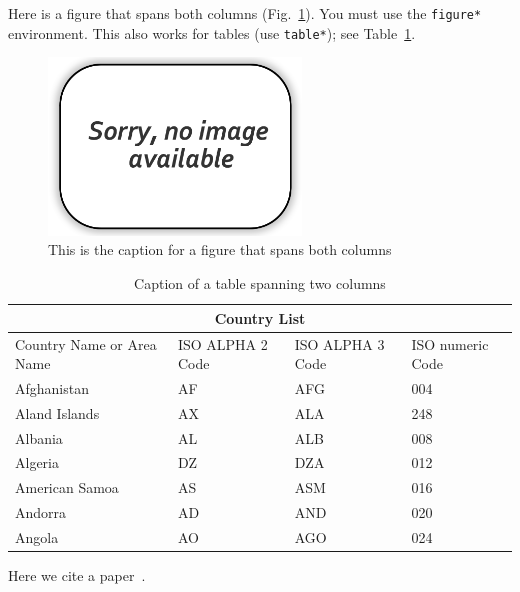 \documentclass[12pt,twocolumn]{article}
\begin{document}
Here is a figure that spans both columns (Fig.~\ref{fig:two_cols}).  You must use the {\tt figure*} environment.  This also works for tables (use {\tt table*}); see Table~\ref{t:two_cols}.
\begin{figure}
	\centering
	\includegraphics[width=0.6\textwidth]{Figs/no-image.png}
	\caption{{\small This is the caption for a figure that spans both columns}}    
	\label{fig:two_cols}
\end{figure}

\begin{table}
	\centering
\begin{tabular}{ |p{3cm}||p{3cm}|p{3cm}|p{3cm}|  }
	\hline
	\multicolumn{4}{|c|}{Country List} \\
	\hline
	Country Name     or Area Name& ISO ALPHA 2 Code &ISO ALPHA 3 Code&ISO numeric Code\\
	\hline
	Afghanistan   & AF    &AFG&   004\\
	Aland Islands&   AX  & ALA   &248\\
	Albania &AL & ALB&  008\\
	Algeria    &DZ & DZA&  012\\
	American Samoa&   AS  & ASM&016\\
	Andorra& AD  & AND   &020\\
	Angola& AO  & AGO&024\\
	\hline
\end{tabular}
\caption{Caption of a table spanning two columns}
\label{t:two_cols}
\end{table}

Here we cite a paper~\cite{fleischmannetalJCND2015}.
\end{document}
